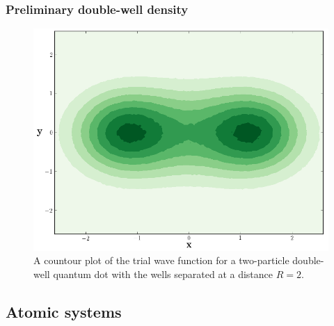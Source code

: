 \begin{frame}
 \frametitle{Preliminary double-well density}
 
 \begin{figure}[h]
 \begin{center}
 \includegraphics[scale=0.25]{../graphics/DoubleWell.png}
  \caption{A countour plot of the trial wave function for a two-particle double-well quantum dot with the wells separated at a distance $R = 2$.}
  \label{fig:doubleWell}
 \end{center}
\end{figure}
 
\end{frame}


\subsection{Atomic systems}

